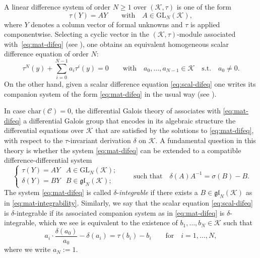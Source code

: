 \documentclass[preprint,12pt]{elsarticle}
\numberwithin{equation}{section} %
\theoremstyle{theorem}
\theoremstyle{definition}
\newcommand{\Ca}{\mathcal{C}} %
\newcommand{\bk}{\mathcal{K}} %
\begin{document}
A linear difference system of order $N\geq 1$ over $(\bk,\tau)$ is one of the form \begin{equation}\label{eq:mat-difeq}
    \tau(Y)=AY\qquad\text{with}\quad A\in\mathrm{GL}_N(\bk),
\end{equation} where $Y$ denotes a column vector of formal unknowns and $\tau$ is applied componentwise. Selecting a cyclic vector in the $(\bk,\tau)$-module associated with~\eqref{eq:mat-difeq} (see \cite[Appendix~B]{hendriks-singer:1999}), one obtains an equivalent homogeneous scalar difference equation of order $N$:\begin{equation}\label{eq:scal-difeq}
    \tau^N(y)+\sum_{i=0}^{N-1}a_i\tau^i(y)=0 \qquad\text{with}\quad a_0,\dots,a_{N-1}\in\bk \quad \text{s.t.} \quad a_0\neq 0.  
\end{equation} On the other hand, given a scalar difference equation \eqref{eq:scal-difeq} one writes its companion system of the form \eqref{eq:mat-difeq} in the usual way (see \cite[p.~5]{vanderput-singer:1997}).

In case $\mathrm{char}(\Ca)=0$, the differential Galois theory of \cite{HardouinSinger2008} associates with \eqref{eq:mat-difeq} a differential Galois group that encodes in its algebraic structure the differential equations over $\bk$ that are satisfied by the solutions to \eqref{eq:mat-difeq}, with respect to the $\tau$-invariant derivation $\delta$ on $\bk$. A fundamental question in this theory is whether the system \eqref{eq:mat-difeq} can be extended to a compatible difference-differential system \begin{equation}\label{eq:mat-integrability}\begin{cases}
    \tau(Y)=AY & A\in\mathrm{GL}_N(\bk);\\
    \delta(Y)=BY & B\in\mathfrak{gl}_N(\bk);
\end{cases}\qquad \text{such that} \quad \delta(A)A^{-1}=\sigma(B)-B.\end{equation} The system \eqref{eq:mat-difeq} is called $\delta$-\emph{integrable} if there exists a $B\in\mathfrak{gl}_N(\bk)$ as in \eqref{eq:mat-integrability}. Similarly, we say that the scalar equation \eqref{eq:scal-difeq} is $\delta$-integrable if its associated companion system as in \eqref{eq:mat-difeq} is $\delta$-integrable, which we see is equivalent to the existence of $b_1,\dots,b_N\in\bk$ such that \begin{equation}\label{eq:scal-integrability}
    a_i\cdot\frac{\delta(a_0)}{a_0}-\delta(a_i)=\tau(b_i)-b_i\qquad\text{for}\quad i=1,\dots,N,
\end{equation} where we write $a_N:=1$. 
\end{document}
